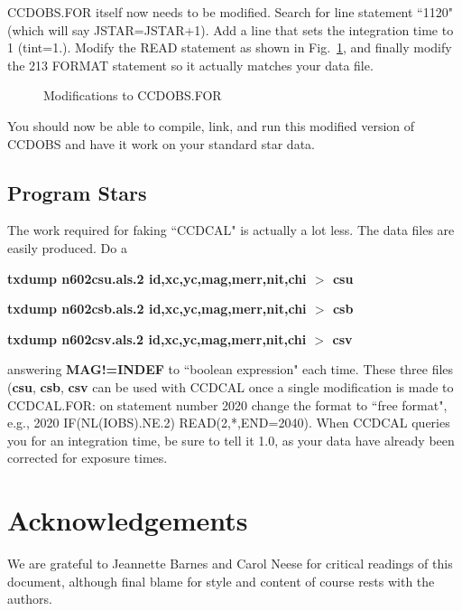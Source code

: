 CCDOBS.FOR itself now needs to be modified.  Search for line statement
``1120" (which will say JSTAR=JSTAR+1).  Add a line that sets the
integration time to 1 (tint=1.).  Modify the READ statement as shown
in Fig.~\ref{ccdobs}, and finally modify the 213 FORMAT statement
so it actually matches your data file.
\begin{figure}
\vspace{2.5in}
\caption{\label{ccdobs} Modifications to CCDOBS.FOR}
\end{figure}
You should now be able to compile, link, and run this modified
version of CCDOBS and have it work on your standard star data.
 
\subsection{Program Stars}
The work required for faking ``CCDCAL" is actually a lot less. The data
files are easily produced.  Do a
 
\centerline{{\bf txdump n602csu.als.2
id,xc,yc,mag,merr,nit,chi $>$ csu} }
 
\centerline{{\bf txdump n602csb.als.2 id,xc,yc,mag,merr,nit,chi $>$
csb}}
 
\centerline{{\bf txdump n602csv.als.2 id,xc,yc,mag,merr,nit,chi $>$
csv}}
 
\noindent
answering {\bf MAG!=INDEF} to ``boolean expression" each time.  
These three files ({\bf csu}, {\bf csb}, {\bf csv} can be used
with CCDCAL once a single modification is made to CCDCAL.FOR: on
statement number 2020 change the format to ``free format", e.g.,
2020 IF(NL(IOBS).NE.2) READ(2,*,END=2040).  When CCDCAL queries
you for an integration time, be sure to tell it 1.0, as your data have
already been corrected for exposure times. 
 
\section{Acknowledgements}
We are grateful to Jeannette Barnes and Carol Neese for critical
readings of this document, although final blame for style and content
of course rests with the authors.


